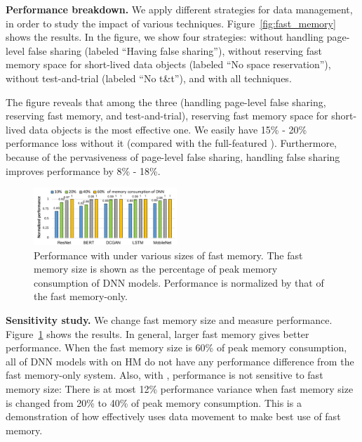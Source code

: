 \textbf{Performance breakdown.}
We apply different strategies for data management, in order to study the impact of various techniques. Figure~\ref{fig:fast_memory} shows the results. In the figure, we show four strategies: \name without handling page-level false sharing (labeled ``Having false sharing''), \name without reserving fast memory space for short-lived data objects (labeled ``No space reservation''), \name without test-and-trial (labeled ``No t\&t''), and \name with all techniques.

The figure reveals that among the three (handling page-level false sharing, reserving fast memory, and test-and-trial), 
reserving fast memory space for short-lived data objects is the most effective one. We easily have \textcolor{check}{15\% - 20\%} 
performance loss without it (compared with the full-featured \name). Furthermore, because of the pervasiveness of page-level false sharing, handling false sharing improves performance by \textcolor{check}{8\% - 18\%}.



\begin{figure}[htb!]
	\centering
	\includegraphics[width=0.48\textwidth]{figures/diff_size.pdf}
	\vspace{-20pt}
\caption{Performance with \name under various sizes of fast memory. The fast memory size is shown as the percentage of peak memory consumption of DNN models. Performance is normalized by that of the fast memory-only.}
\vspace{-5pt}
\label{fig:fast_memory_sen}
\end{figure}

\textbf{Sensitivity study.}
We change fast memory size and measure performance. Figure~\ref{fig:fast_memory_sen} shows the results. In general, larger fast memory gives better performance. When the fast memory size is 60\% of peak memory consumption, all of DNN models with \name on HM do not have any performance difference from the fast memory-only system. Also, with \name, performance is not sensitive to fast memory size: There is at most 12\% performance variance \textcolor{check}{when fast memory size is changed from 20\% to 40\% of peak memory consumption}. This is a demonstration of how \name effectively uses data movement to make best use of fast memory. 

